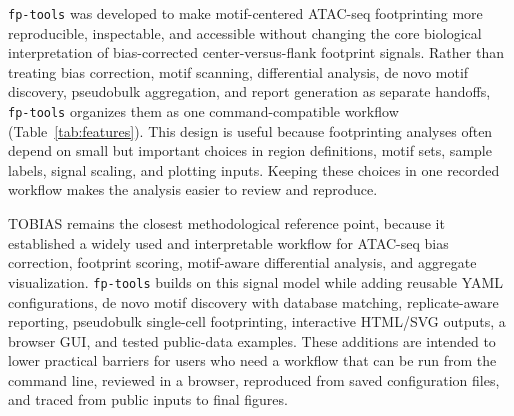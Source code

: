 \documentclass[biomedinformatics,article,submit,pdftex,moreauthors]{Definitions/mdpi}
\begin{document}
\texttt{fp-tools} was developed to make motif-centered ATAC-seq footprinting
more reproducible, inspectable, and accessible without changing the core
biological interpretation of bias-corrected center-versus-flank footprint
signals. Rather than treating bias correction, motif scanning, differential
analysis, de novo motif discovery, pseudobulk aggregation, and report generation
as separate handoffs, \texttt{fp-tools} organizes them as one
command-compatible workflow (Table~\ref{tab:features}). This design is useful
because footprinting analyses often depend on small but important choices in
region definitions, motif sets, sample labels, signal scaling, and plotting
inputs. Keeping these choices in one recorded workflow makes the analysis easier
to review and reproduce.

TOBIAS remains the closest methodological reference point, because it established
a widely used and interpretable workflow for ATAC-seq bias correction, footprint
scoring, motif-aware differential analysis, and aggregate visualization.
\texttt{fp-tools} builds on this signal model while adding reusable YAML
configurations, de novo motif discovery with database matching,
replicate-aware reporting, pseudobulk single-cell footprinting, interactive
HTML/SVG outputs, a browser GUI, and tested public-data examples. These additions
are intended to lower practical barriers for users who need a workflow that can
be run from the command line, reviewed in a browser, reproduced from saved
configuration files, and traced from public inputs to final figures.
\end{document}
